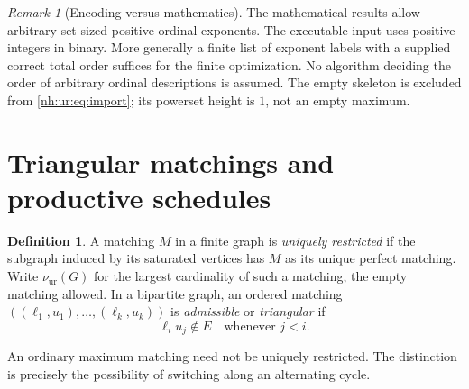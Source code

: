 \documentclass[11pt,a4paper]{article}
\theoremstyle{definition}
\newtheorem{definition}[theorem]{Definition}
\theoremstyle{remark}
\newtheorem{remark}[theorem]{Remark}
\newcommand{\nuur}{\nu_{\mathrm{ur}}}
\begin{document}
\begin{remark}[Encoding versus mathematics]\label{nh:ur:rem:encoding}
The mathematical results allow arbitrary set-sized positive ordinal
exponents. The executable input uses positive integers in binary. More
generally a finite list of exponent labels with a supplied correct total
order suffices for the finite optimization. No algorithm deciding the order
of arbitrary ordinal descriptions is assumed. The empty skeleton is excluded
from \eqref{nh:ur:eq:import}; its powerset height is $1$, not an empty
maximum.
\end{remark}

\section{Triangular matchings and productive schedules}\label{nh:ur:sec:matching}
\setcounter{equation}{0}

\begin{definition}\label{nh:ur:def:ur}
A matching $M$ in a finite graph is \emph{uniquely restricted} if the
subgraph induced by its saturated vertices has $M$ as its unique perfect
matching. Write $\nuur(G)$ for the largest cardinality of such a matching,
the empty matching allowed. In a bipartite graph, an ordered matching
$((\ell_1,u_1),\ldots,(\ell_k,u_k))$ is \emph{admissible} or
\emph{triangular} if
\begin{equation}\label{nh:ur:eq:triangular}
 \ell_i u_j\notin E\quad\text{whenever }j<i.
\end{equation}
\end{definition}
An ordinary maximum matching need not be uniquely restricted. The distinction
is precisely the possibility of switching along an alternating cycle.
\end{document}
